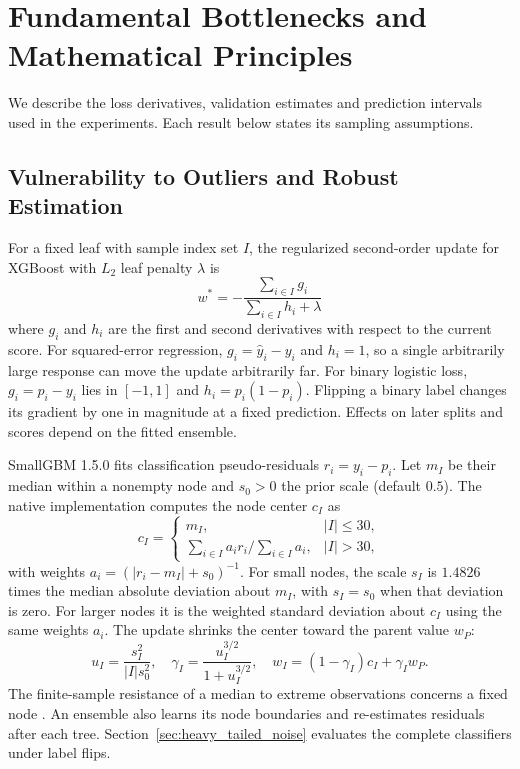 \documentclass[journal]{IEEEtran}
\begin{document}
\section{Fundamental Bottlenecks and Mathematical Principles}
\label{sec:theory}

We describe the loss derivatives, validation estimates and prediction intervals used in the experiments. Each result below states its sampling assumptions.

\subsection{Vulnerability to Outliers and Robust Estimation}
For a fixed leaf with sample index set $I$, the regularized second-order update for XGBoost with $L_2$ leaf penalty $\lambda$ is \cite{chen2016xgboost}
\begin{equation}
\label{eq:taylor_leaf}
w^* = -\frac{\sum_{i \in I} g_i}{\sum_{i \in I} h_i + \lambda}
\end{equation}
where $g_i$ and $h_i$ are the first and second derivatives with respect to the current score. For squared-error regression, $g_i=\widehat y_i-y_i$ and $h_i=1$, so a single arbitrarily large response can move the update arbitrarily far. For binary logistic loss, $g_i=p_i-y_i$ lies in $[-1,1]$ and $h_i=p_i(1-p_i)$. Flipping a binary label changes its gradient by one in magnitude at a fixed prediction. Effects on later splits and scores depend on the fitted ensemble.

SmallGBM 1.5.0 fits classification pseudo-residuals $r_i=y_i-p_i$. Let $m_I$ be their median within a nonempty node and $s_0>0$ the prior scale (default $0.5$). The native implementation computes the node center $c_I$ as
\begin{equation}\label{eq:median_leaf}
c_I=\begin{cases}
m_I,& |I|\leq30,\\
\sum_{i\in I} a_i r_i / \sum_{i\in I} a_i,& |I|>30,
\end{cases}
\end{equation}
with weights $a_i=(|r_i-m_I|+s_0)^{-1}$. For small nodes, the scale $s_I$ is $1.4826$ times the median absolute deviation about $m_I$, with $s_I=s_0$ when that deviation is zero. For larger nodes it is the weighted standard deviation about $c_I$ using the same weights $a_i$. The update shrinks the center toward the parent value $w_P$:
\begin{equation}
\label{eq:mad_shrinkage}
u_I=\frac{s_I^2}{|I|s_0^2},\quad
\gamma_I=\frac{u_I^{3/2}}{1+u_I^{3/2}},\quad
w_I=(1-\gamma_I)c_I+\gamma_I w_P.
\end{equation}
The finite-sample resistance of a median to extreme observations concerns a fixed node \cite{huber2009robust}. An ensemble also learns its node boundaries and re-estimates residuals after each tree. Section~\ref{sec:heavy_tailed_noise} evaluates the complete classifiers under label flips.
\end{document}
